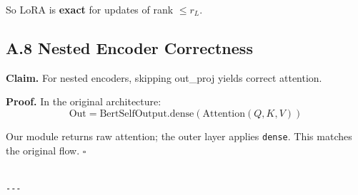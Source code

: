 So LoRA is \textbf{exact} for updates of rank $\leq r_L$.

\subsection{A.8 Nested Encoder Correctness}

\textbf{Claim.} For nested encoders, skipping out\_proj yields correct attention.

\textbf{Proof.} In the original architecture:
\[
\text{Out} = \text{BertSelfOutput.dense}(\text{Attention}(Q, K, V))
\tag{A.10}
\]

Our module returns raw attention; the outer layer applies \texttt{dense}. This 
matches the original flow. $\square$
\begin{lstlisting}

---
\end{lstlisting}